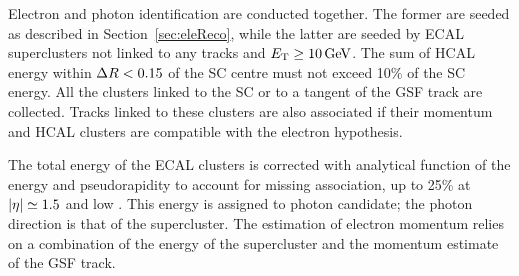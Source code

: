 Electron and photon identification are conducted together.
The former are seeded as described in Section~\ref{sec:eleReco},
while the latter are seeded by ECAL superclusters not linked to any tracks and $E_{\mathrm{T}} \geq 10 \,\text{Ge\hspace{-.08em}V}$.
The sum of HCAL energy within $\Delta R < 0.15$ of the SC centre must not exceed 10\usep\% of the SC energy.
All the clusters linked to the SC or to a tangent of the GSF track are collected.
Tracks linked to these clusters are also associated if their momentum and HCAL clusters are compatible with the electron hypothesis.

The total energy of the ECAL clusters is corrected with analytical function of the energy and pseudorapidity to account for missing association,
up to 25\usep\% at $\lvert \eta \rvert \simeq 1.5$ and low \pt.
This energy is assigned to photon candidate; the photon direction is that of the supercluster.
The estimation of electron momentum
relies on a combination of the energy of the supercluster and the momentum estimate of the GSF track.
